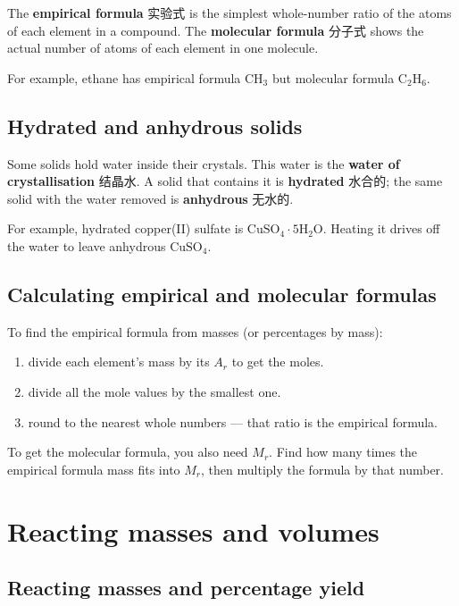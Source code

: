 \documentclass[11pt]{article}
\begin{document}
The \textbf{empirical formula} 实验式 is the simplest whole-number ratio of the atoms of each element in a compound. The \textbf{molecular formula} 分子式 shows the actual number of atoms of each element in one molecule.

For example, ethane has empirical formula $\text{CH}_3$ but molecular formula $\text{C}_2\text{H}_6$.

\subsection*{Hydrated and anhydrous solids}

Some solids hold water inside their crystals. This water is the \textbf{water of crystallisation} 结晶水. A solid that contains it is \textbf{hydrated} 水合的; the same solid with the water removed is \textbf{anhydrous} 无水的.

For example, hydrated copper(II) sulfate is $\text{CuSO}_4 \cdot 5\text{H}_2\text{O}$. Heating it drives off the water to leave anhydrous $\text{CuSO}_4$.

\subsection*{Calculating empirical and molecular formulas}

To find the empirical formula from masses (or percentages by mass):

\begin{enumerate}
\item divide each element's mass by its $A_r$ to get the moles.

\item divide all the mole values by the smallest one.

\item round to the nearest whole numbers — that ratio is the empirical formula.

\end{enumerate}

To get the molecular formula, you also need $M_r$. Find how many times the empirical formula mass fits into $M_r$, then multiply the formula by that number.

\section*{Reacting masses and volumes}

\subsection*{Reacting masses and percentage yield}
\end{document}
